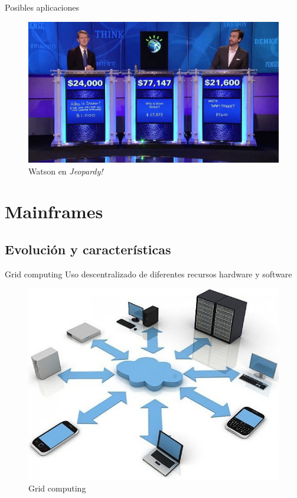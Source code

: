 \documentclass[compress]{beamer}
\begin{document}
\begin{frame}{Posibles aplicaciones}
	\begin{figure}
		\centering
		\includegraphics[width=.95\linewidth]{./Imagenes/j-watson.jpg}
		\caption{Watson en \textit{Jeopardy!}}
		\label{watson}
	\end{figure}
\end{frame}

\section{Mainframes}
\subsection{Evolución y características}
\begin{frame}
	\begin{block}{Grid computing}
		Uso descentralizado de diferentes recursos hardware y software
	\end{block}
	\begin{figure}
		\centering
		\includegraphics[width=.65\linewidth]{./Imagenes/grid-c.jpg}
		\caption{Grid computing}
		\label{grid-c}
	\end{figure}
\end{frame}
\end{document}
